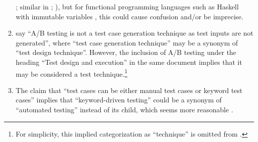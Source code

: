 \begin{enumerate}
          ; similar in \citeyear[p.~27]{IEEE2012};
          \citealp[p.~424]{vanVliet2000}), but for functional programming
          languages such as Haskell with immutable variables
          \citep{WikiHaskell2023}, this could cause confusion and/or be
          imprecise.
    \item %
          \citet[p.~36]{IEEE2022} say ``A/B testing is not a test
          case generation technique as test inputs are not generated'', where
          ``test case generation technique'' may be a synonym of ``test design
          technique''. However, the inclusion of A/B testing under the heading
          ``Test design and execution'' in the same document implies that it
          may be considered a test technique.\footnote{For simplicity, this
              implied categorization as ``technique'' is omitted from
              .}
    \item %
          The claim that ``test cases can be either manual test cases or
          keyword test cases'' \citep[p.~6]{IEEE2016} implies that ``keyword-driven
          testing'' could be a synonym of ``automated testing'' instead of its
          child, which seems more reasonable \citeyearpar[p.~4;][p.~35]{IEEE2022}.


\end{enumerate}
